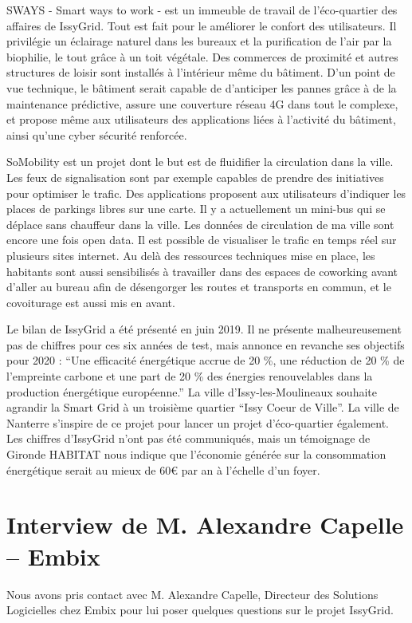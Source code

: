 SWAYS - Smart ways to work - est un immeuble de travail de l'éco-quartier des affaires de IssyGrid.
Tout est fait pour le améliorer le confort des utilisateurs.
Il privilégie un éclairage naturel dans les bureaux et la purification de l'air par la biophilie,
le tout grâce à un toit végétale. Des commerces de proximité et autres structures de loisir
sont installés à l'intérieur même du bâtiment. D'un point de vue technique, le bâtiment serait
capable de d'anticiper les pannes grâce à de la maintenance prédictive, assure une couverture réseau
4G dans tout le complexe, et propose même aux utilisateurs des applications liées à l'activité du
bâtiment, ainsi qu'une cyber sécurité renforcée.

SoMobility est un projet dont le but est de fluidifier la circulation dans la ville. Les feux de
signalisation sont par exemple capables de prendre des initiatives pour optimiser le trafic.
Des applications proposent aux utilisateurs d'indiquer les places de parkings libres sur une carte.
Il y a actuellement un mini-bus qui se déplace sans chauffeur dans la ville.
Les données de circulation de ma ville sont encore une fois open data. Il est possible de visualiser
le trafic en temps réel sur plusieurs sites internet.
Au delà des ressources techniques mise en place, les habitants sont aussi sensibilisés à travailler
dans des espaces de coworking avant d'aller au bureau afin de désengorger les routes et transports
en commun, et le covoiturage est aussi mis en avant.

Le bilan de IssyGrid a été présenté en juin 2019.
Il ne présente malheureusement pas de chiffres pour ces six années de test, mais annonce en revanche
ses objectifs pour 2020 : ``Une efficacité énergétique accrue de 20 \%, une réduction de 20 \%
de l’empreinte carbone et une part de 20 \% des énergies renouvelables dans la production
énergétique européenne.''
La ville d'Issy-les-Moulineaux souhaite agrandir la Smart Grid à un troisième quartier
``Issy Coeur de Ville''. La ville de Nanterre s'inspire de ce projet pour lancer un projet
d'éco-quartier également.
Les chiffres d'IssyGrid n'ont pas été communiqués, mais un témoignage de Gironde HABITAT nous indique
que l'économie générée sur la consommation énergétique serait au mieux de 60€ par an à l'échelle d'un
foyer.

\section{Interview de M. Alexandre Capelle – Embix}
Nous avons pris contact avec M. Alexandre Capelle, Directeur des Solutions Logicielles chez Embix pour
lui poser quelques questions sur le projet IssyGrid.

